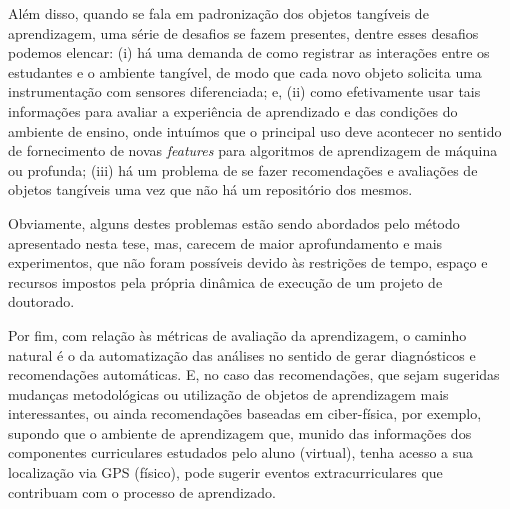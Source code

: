 Além disso, quando se fala em padronização dos objetos tangíveis de aprendizagem, uma série de desafios se fazem presentes, dentre esses desafios podemos elencar: (i) há uma demanda de como registrar as interações entre os estudantes e o ambiente tangível, de modo que cada novo objeto solicita uma instrumentação com sensores diferenciada; e, (ii) como efetivamente usar tais informações para avaliar a experiência de aprendizado e das condições do ambiente de ensino, onde intuímos que o principal uso deve acontecer no sentido de fornecimento de novas \textit{features} para algoritmos de aprendizagem de máquina ou profunda; (iii) há um problema de se fazer recomendações e avaliações de objetos tangíveis uma vez que não há um repositório dos mesmos.

Obviamente, alguns destes problemas estão sendo abordados pelo método apresentado nesta tese, mas, carecem de maior aprofundamento e mais experimentos, que não foram possíveis devido às restrições de tempo, espaço e recursos impostos pela própria dinâmica de execução de um projeto de doutorado. 

Por fim, com relação às métricas de avaliação da aprendizagem, o caminho natural é o da automatização das análises no sentido de gerar diagnósticos e recomendações automáticas. E, no caso das recomendações, que sejam sugeridas mudanças metodológicas ou utilização de objetos de aprendizagem mais interessantes, ou ainda recomendações baseadas em ciber-física, por exemplo, supondo que o ambiente de aprendizagem que, munido das informações dos componentes curriculares estudados pelo aluno (virtual), tenha acesso a sua localização via GPS (físico), pode sugerir eventos extracurriculares que contribuam com o processo de aprendizado.